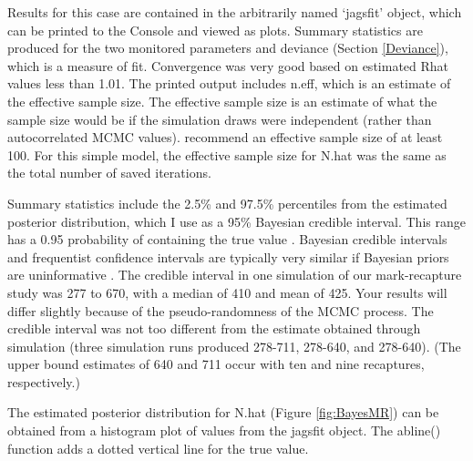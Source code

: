 \documentclass[
]{krantz}
\makeatletter
\newenvironment{Shaded}{\begin{snugshade}}{\end{snugshade}}
\newcommand{\AttributeTok}[1]{\textcolor[rgb]{0.27,0.27,0.27}{#1}}
\newcommand{\DecValTok}[1]{\textcolor[rgb]{0.06,0.06,0.06}{#1}}
\newcommand{\FunctionTok}[1]{\textcolor[rgb]{0.27,0.27,0.27}{\textbf{#1}}}
\newcommand{\NormalTok}[1]{#1}
\newcommand{\SpecialCharTok}[1]{\textcolor[rgb]{0.43,0.43,0.43}{\textbf{#1}}}
\newcommand{\StringTok}[1]{\textcolor[rgb]{0.5,0.5,0.5}{#1}}
\newenvironment{kframe}{%
\medskip{}
\setlength{\fboxsep}{.8em}
 \def\at@end@of@kframe{}%
 \ifinner\ifhmode%
  \def\at@end@of@kframe{\end{minipage}}%
  \begin{minipage}{\columnwidth}%
 \fi\fi%
 \def\FrameCommand##1{\hskip\@totalleftmargin \hskip-\fboxsep
 \colorbox{shadecolor}{##1}\hskip-\fboxsep
     \hskip-\linewidth \hskip-\@totalleftmargin \hskip\columnwidth}%
 \MakeFramed {\advance\hsize-\width
   \@totalleftmargin\z@ \linewidth\hsize
   \@setminipage}}%
 {\par\unskip\endMakeFramed%
 \at@end@of@kframe}
\renewenvironment{Shaded}{\begin{kframe}}{\end{kframe}}
\makeatother
\begin{document}
Results for this case are contained in the arbitrarily named `jagsfit' object, which can be printed to the Console and viewed as plots. Summary statistics are produced for the two monitored parameters and deviance (Section \ref{Deviance}), which is a measure of fit. Convergence was very good based on estimated Rhat values less than 1.01. The printed output includes n.eff, which is an estimate of the effective sample size. The effective sample size is an estimate of what the sample size would be if the simulation draws were independent (rather than autocorrelated MCMC values). \citet{gelman.hill_2007} recommend an effective sample size of at least 100. For this simple model, the effective sample size for N.hat was the same as the total number of saved iterations.

Summary statistics include the 2.5\% and 97.5\% percentiles from the estimated posterior distribution, which I use as a 95\% Bayesian credible interval. This range has a 0.95 probability of containing the true value \citep{mccarthy_2007}. Bayesian credible intervals and frequentist confidence intervals are typically very similar if Bayesian priors are uninformative \citep{mccarthy_2007, kéry.schaub_2012}. The credible interval in one simulation of our mark-recapture study was 277 to 670, with a median of 410 and mean of 425. Your results will differ slightly because of the pseudo-randomness of the MCMC process. The credible interval was not too different from the estimate obtained through simulation (three simulation runs produced 278-711, 278-640, and 278-640). (The upper bound estimates of 640 and 711 occur with ten and nine recaptures, respectively.)

The estimated posterior distribution for N.hat (Figure \ref{fig:BayesMR}) can be obtained from a histogram plot of values from the jagsfit object. The abline() function adds a dotted vertical line for the true value.

\begin{Shaded}
\end{Shaded}
\end{document}
